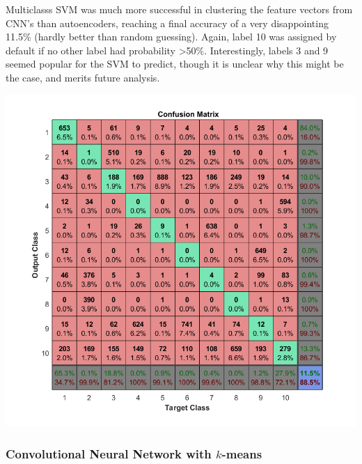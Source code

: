 \documentclass[11pt]{article}
\begin{document}
Multiclasss SVM was much more successful in clustering the feature vectors from CNN's than autoencoders, reaching a final accuracy of a very disappointing 11.5\% (hardly better than random guessing). Again, label 10 was assigned by default if no other label had probability >50\%. Interestingly, labels 3 and 9 seemed popular for the SVM to predict, though it is unclear why this might be the case, and merits future analysis.

\begin{center}
\includegraphics[scale=0.4]{convnet_svm_3.png}
\end{center}

\subsubsection{Convolutional Neural Network with $k$-means}
\end{document}

